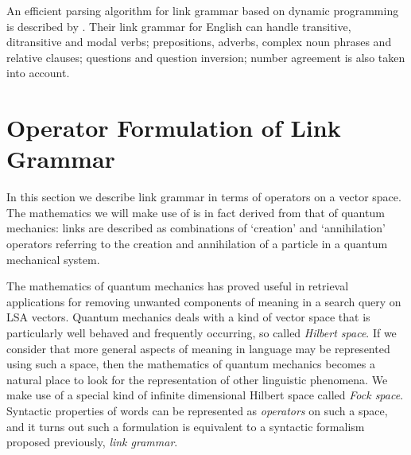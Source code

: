 \documentclass[12pt]{report}
\begin{document}
An efficient parsing algorithm for link grammar based on dynamic programming is described by \cite{Sleator:91}. Their link grammar for English can handle transitive, ditransitive and modal verbs; prepositions, adverbs, complex noun phrases and relative clauses; questions and question inversion; number agreement is also taken into account.

\section{Operator Formulation of Link Grammar}

In this section we describe link grammar in terms of operators on a vector space. The mathematics we will make use of is in fact derived from that of quantum mechanics: links are described as combinations of `creation' and `annihilation' operators referring to the creation and annihilation of a particle in a quantum mechanical system.


The mathematics of quantum mechanics has proved useful in retrieval applications for removing unwanted components of meaning in a search query \cite{Widdows:03} on LSA vectors.
Quantum mechanics deals with a kind of vector space that is particularly well behaved and frequently occurring, so called \emph{Hilbert space}. If we consider that more general aspects of meaning in language may be represented using such a space, then the mathematics of quantum mechanics becomes a natural place to look for the representation of other linguistic phenomena. We make use of a special kind of infinite dimensional Hilbert space called \emph{Fock space}. Syntactic properties of words can be represented as \emph{operators} on such a space, and it turns out such a formulation is equivalent to a syntactic formalism proposed previously, \emph{link grammar}.
\end{document}
